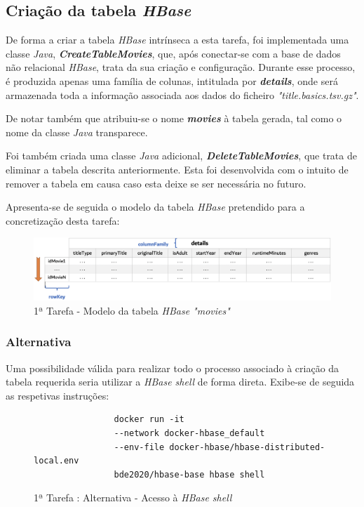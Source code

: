 \documentclass[a4paper]{report}
\begin{document}
{		\subsection{Criação da tabela \textit{HBase}} \label{subsec:Task1-1}
		De forma a criar a tabela \textit{HBase} intrínseca a esta tarefa, foi implementada uma classe \textit{Java}, \textbf{\textit{CreateTableMovies}}, que, após conectar-se com a base de dados não relacional \textit{HBase}, trata da sua criação e configuração.
		Durante esse processo, é produzida apenas uma família de colunas, intitulada por \textbf{\textit{details}}, onde será armazenada toda a informação associada aos dados do ficheiro \textit{"title.basics.tsv.gz"}.
		
		De notar também que atribuiu-se o nome \textbf{\textit{movies}} à tabela gerada, tal como o nome da classe \textit{Java} transparece.
		
		Foi também criada uma classe \textit{Java} adicional, \textbf{\textit{DeleteTableMovies}}, que trata de eliminar a tabela descrita anteriormente.
		Esta foi desenvolvida com o intuito de remover a tabela em causa caso esta deixe se ser necessária no futuro.
		
		Apresenta-se de seguida o modelo da tabela \textit{HBase} pretendido para a concretização desta tarefa:
		\begin{figure}[H]
			\centering
			\includegraphics[width=1.0\textwidth]{Imagens/1ª Tarefa - Tabela Hbase.png}
			\caption{1ª Tarefa - Modelo da tabela \textit{HBase "movies"}}
			\label{fig:5}
		\end{figure}
		
		\subsubsection{Alternativa}
		Uma possibilidade válida para realizar todo o processo associado à criação da tabela requerida seria utilizar a \textit{HBase shell} de forma direta.
		Exibe-se de seguida as respetivas instruções:
		\begin{figure}[H]
			{
				\color{teal}
				\begin{verbatim}
				docker run -it
				--network docker-hbase_default
				--env-file docker-hbase/hbase-distributed-local.env
				bde2020/hbase-base hbase shell
				\end{verbatim}
			}
			\caption{1ª Tarefa : Alternativa - Acesso à \textit{HBase shell}}
			\label{fig:6}
		\end{figure}
		
}
\end{document}
